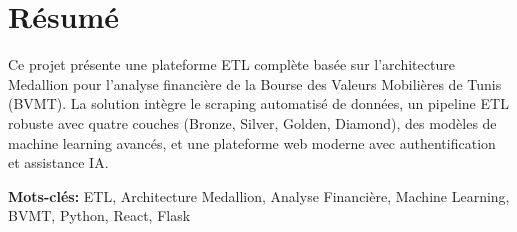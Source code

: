 \section*{Résumé}
Ce projet présente une plateforme ETL complète basée sur l'architecture Medallion pour l'analyse financière de la Bourse des Valeurs Mobilières de Tunis (BVMT). La solution intègre le scraping automatisé de données, un pipeline ETL robuste avec quatre couches (Bronze, Silver, Golden, Diamond), des modèles de machine learning avancés, et une plateforme web moderne avec authentification et assistance IA.

\textbf{Mots-clés:} ETL, Architecture Medallion, Analyse Financière, Machine Learning, BVMT, Python, React, Flask

\newpage



